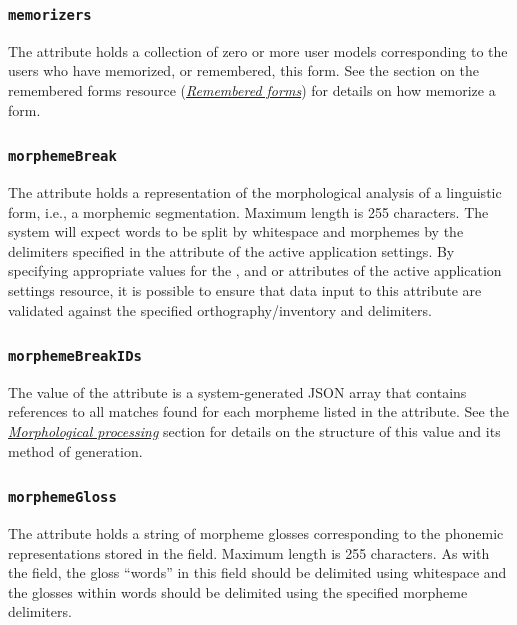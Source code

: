 \documentclass[letterpaper,10pt,english]{sphinxmanual}
\begin{document}
\subsubsection{\texttt{memorizers}}
\label{datastructure:memorizers}
The  attribute holds a collection of zero or more user models
corresponding to the users who have memorized, or remembered, this form.  See
the section on the remembered forms resource ({\hyperref[interface:remembered-forms-interface]{\emph{Remembered forms}}})
for details on how memorize a form.


\subsubsection{\texttt{morphemeBreak}}
\label{datastructure:morphemebreak}
The  attribute holds a representation of the morphological
analysis of a linguistic form, i.e., a morphemic segmentation.  Maximum length
is 255 characters.  The system will expect words to be split by whitespace and
morphemes by the delimiters specified in the  attribute of
the active application settings.  By specifying appropriate values for the
,  and
 or  attributes of the active
application settings resource, it is possible to ensure that data input to this
attribute are validated against the specified orthography/inventory and
delimiters.


\subsubsection{\texttt{morphemeBreakIDs}}
\label{datastructure:morphemebreakids}
The value of the  attribute is a system-generated JSON array
that contains references to all matches found for each morpheme listed in the
 attribute.  See the {\hyperref[interface:morphological-processing]{\emph{Morphological processing}}} section
for details on the structure of this value and its method of generation.


\subsubsection{\texttt{morphemeGloss}}
\label{datastructure:morphemegloss}
The  attribute holds a string of morpheme glosses corresponding
to the phonemic representations stored in the  field.  Maximum
length is 255 characters. As with the  field, the gloss ``words''
in this field should be delimited using whitespace and the glosses within words
should be delimited using the specified morpheme delimiters.
\end{document}
